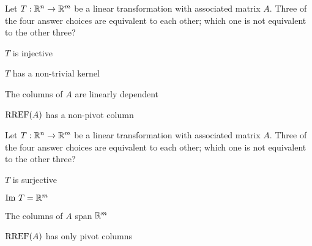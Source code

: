 \documentclass{article}
\begin{document}
\begin{readinessAssuranceTest}
\item Let $T: \mathbb{R}^n \rightarrow \mathbb{R}^m$ be a linear transformation with associated matrix $A$.  Three of the four answer choices are equivalent to each other; which one is not equivalent to the other three?
\begin{readinessAssuranceTestChoices}
\item $T$ is injective
\item $T$ has a non-trivial kernel
\item The columns of $A$ are linearly dependent
\item $\operatorname{RREF}(A)$ has a non-pivot column
\end{readinessAssuranceTestChoices}

\item Let $T: \mathbb{R}^n \rightarrow \mathbb{R}^m$ be a linear transformation with associated matrix $A$.  Three of the four answer choices are equivalent to each other; which one is not equivalent to the other three?
\begin{readinessAssuranceTestChoices}
\item $T$ is surjective
\item ${\rm Im\ } T = \mathbb{R}^m$
\item The columns of $A$ span $\mathbb{R}^m$
\item $\operatorname{RREF}(A)$ has only pivot columns
\end{readinessAssuranceTestChoices}
%
%

\end{readinessAssuranceTest}
\end{document}
